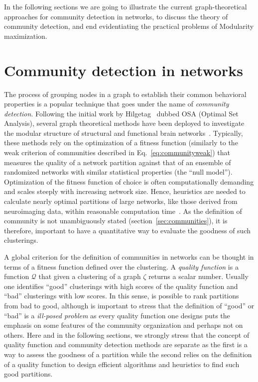 In the following sections we are going to illustrate the current graph-theoretical approaches for community detection in networks, to discuss the theory of community detection, and end evidentiating the practical problems of Modularity maximization.


\section{Community detection in networks}
\label{sec:communitydetectioninnetworks}
The process of grouping nodes in a graph to establish their common behavioral properties is a popular technique that goes under the name of \emph{community detection}.
Following the initial work by Hilgetag~\cite{hilgetag2000a} dubbed OSA (Optimal Set Analysis), several graph theoretical methods have been deployed to investigate the modular structure of structural and functional brain networks~\cite{meunier2009,meunier2010,power2011}.
Typically, these methods rely on the optimization of a fitness function (similarly to the weak criterion of communities described in Eq.~\ref{eq:communityweak}) that measures the quality of a network partition against that of an ensemble of randomized networks with similar statistical properties (the ``null model''). Optimization of the fitness function of choice is often computationally demanding and scales steeply with increasing network size.
Hence, heuristics are needed to calculate nearly optimal partitions of large networks, like those derived from neuroimaging data, within reasonable computation time~\cite{blondel2008,rosvall2008}.
As the definition of community is not unambiguously stated (section~\ref{sec:communities}), it is therefore, important to have a quantitative way to evaluate the goodness of such clusterings.

A global criterion for the definition of communities in networks can be thought in terms of a fitness function defined over the clustering.
A \emph{quality function} is a function $\mathcal{Q}$ that given a clustering of a graph $\zeta$ returns a scalar number. Usually one identifies ``good'' clusterings with high scores of the quality function and ``bad'' clusterings with low scores. In this sense, is possible to rank partitions from bad to good, although is important to stress that the definition of ``good'' or ``bad'' is a \emph{ill-posed problem} as every quality function one designs puts the emphasis on some features of the community organization and perhaps not on others. 
Here and in the following sections, we strongly stress that the concept of quality function and community detection methods are separate as the first is a way to assess the goodness of a partition while the second relies on the definition of a quality function to design efficient algorithms and heuristics to find such good partitions.

